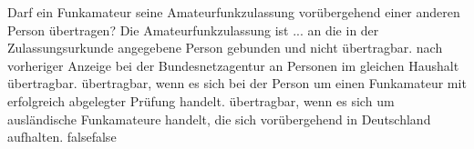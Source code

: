     {Darf ein Funkamateur seine Amateurfunkzulassung vorübergehend einer anderen Person übertragen? Die Amateurfunkzulassung ist ...}
    {an die in der Zulassungsurkunde angegebene Person gebunden und nicht übertragbar.}
    {nach vorheriger Anzeige bei der Bundesnetzagentur an Personen im gleichen Haushalt übertragbar.}
    {übertragbar, wenn es sich bei der Person um einen Funkamateur mit erfolgreich abgelegter Prüfung handelt.}
    {übertragbar, wenn es sich um ausländische Funkamateure handelt, die sich vorübergehend in Deutschland aufhalten.}
    {false}{false}